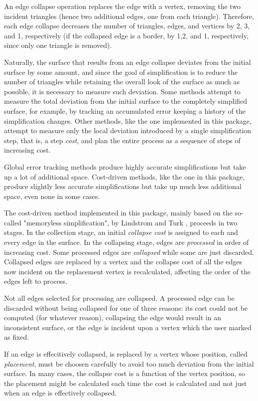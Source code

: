 An edge collapse operation replaces the edge with a vertex, removing the two incident triangles (hence two additional edges, one from each triangle). Therefore, each edge collapse decreases the number of triangles, edges, and vertices by 2, 3, and 1, respectively (if the collapsed edge is a border, by 1,2, and 1, respectively, since only one triangle is removed).

Naturally, the surface that results from an edge collapse deviates from the initial surface by some amount, and since the goal of simplification is to reduce the number of triangles while retaining the overall look of the surface as much as possible, it is necessary to measure such deviation. Some methods attempt to measure the total deviation from the initial surface to the completely simplified surface, for example, by tracking an accumulated error keeping a history of the simplification changes. Other methods, like the one implemented in this package, attempt to measure only the local deviation introduced by a single simplification step, that is, a step {\em cost}, and plan the entire process as a sequence of steps of increasing cost. 

Global error tracking methods produce highly accurate simplifications but take up a lot of additional space. Cost-driven methods, like the one in this package, produce slightly less accurate simplifications but take up much less additional space, even none in some cases.

The cost-driven method implemented in this package, mainly based on the so-called "memoryless simplification", by Lindstrom and Turk \cite{a}, proceeds in two stages. In the collection stage, an initial {\em collapse cost} is assigned to each and every edge in the surface. In the collapsing stage, edges are {\em processed} in order of increasing cost. Some processed edges are {\em collapsed} while some are just discarded. Collapsed edges are replaced by a vertex and the collapse cost of all the edges now incident on the replacement vertex is recalculated, affecting the order of the edges left to process.

Not all edges selected for processing are collapsed. A processed edge can be discarded without being collapsed for one of three reasons: its cost could not be computed (for whatever reason), collapsing the edge would result in an inconsistent surface, or the edge is incident upon a vertex which the user marked as fixed.

If an edge is effecitively collapsed, is replaced by a vertex whose position, called {\em placement}, must be choosen carefully to avoid too much deviation from the initial surface. In many cases, the collapse cost is a function of the vertex position, so the placement might be calculated each time the cost is calculated and not just when an edge is effectively collapsed.

